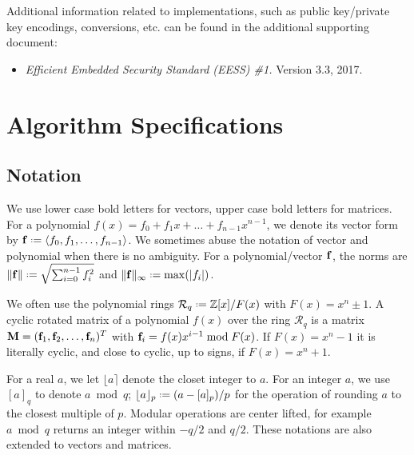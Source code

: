 \documentclass{llncs}
\newcommand{\Rcal}{{\mathcal R}}
\newcommand{\ZZ}{\mathbb{Z}}
\newcommand{\bff}{{\bf f}}
\newcommand{\bfM}{{\bf M}}
\newcommand{\<}{\langle}
\renewcommand{\>}{\rangle}
\newcommand*{\defeq}{\mathrel{\vcenter{\baselineskip0.5ex \lineskiplimit0pt
                     \hbox{\scriptsize.}\hbox{\scriptsize.}}}%
                     =}
\begin{document}
Additional information related to implementations, such as public key/private key encodings, 
conversions, etc. can be found in the additional supporting document:

\begin{itemize}
\item {\em Efficient Embedded Security Standard (EESS) \#1.} Version 3.3, 2017.
\end{itemize}


\section{Algorithm Specifications}
\subsection{Notation}

We use lower case bold letters for vectors, upper case bold letters for matrices.
For a polynomial $f(x) = f_0+f_1x+\dots+ f_{n-1}x^{n-1}$, 
we denote its vector form by $\bff \defeq \left<f_0, f_1, \dots, f_{n-1}\right>$.  We sometimes abuse the notation of vector and polynomial when there is no ambiguity.
For a polynomial/vector $\bff$, the norms are $\|\bff\| \defeq \sqrt{\sum_{i=0}^{n-1}f_i^2}$ and $\|\bff\|_\infty \defeq \max(|f_i|)$. 

We often use the polynomial rings $\Rcal_q \defeq \ZZ[x]/F(x)$ with $F(x) = x^n\pm 1$. %
A cyclic rotated matrix of a polynomial $f(x)$ over the ring $\Rcal_q$
is a matrix $\bfM = (\bff_1,\bff_2,\dots,\bff_n)^T$ with $\bff_i = f(x)x^{i-1}\bmod F(x)$.
If  $F(x) = x^n- 1$ it is literally cyclic, and close to cyclic, up to signs, if $F(x) = x^n + 1$.

For a real $a$, we let 
$\lfloor a\rceil$ denote the closet integer to $a$.
 For an integer $a$, we use
$[a]_q$ to denote $a\bmod q$; $\lfloor a\rfloor_p \defeq (a - [a]_p )/p$ for the operation of rounding $a$ to the closest multiple of $p$. 
Modular operations are center lifted, for example $a\bmod q$ returns an integer within $-q/2$ and $q/2$. These notations are also extended to vectors and matrices.

\end{document}
